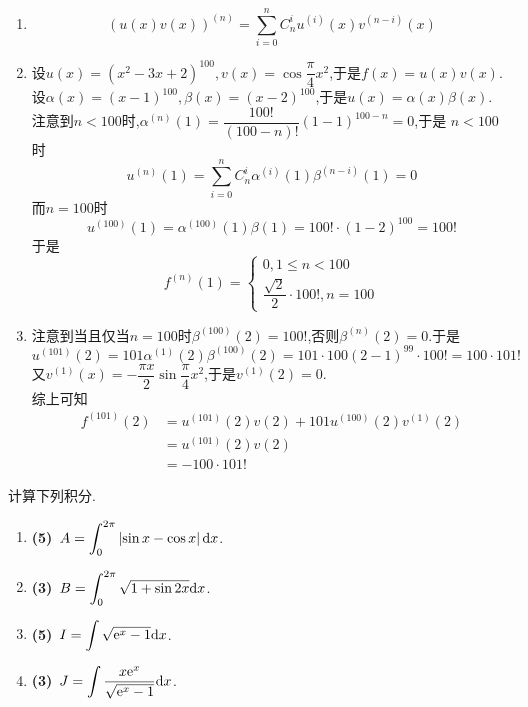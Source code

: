 \documentclass{ctexart}
\begin{document}
\begin{solution}
    \begin{enumerate}[label=\textbf{(\arabic*)}]
        \item $$\left(u(x)v(x)\right)^{(n)}=\sum_{i=0}^{n}C_n^iu^{(i)}(x)v^{(n-i)}(x)$$
        \item 设$u(x)=\left(x^2-3x+2\right)^{100},v(x)=\cos\dfrac{\pi}{4}x^2$,于是$f(x)=u(x)v(x)$.\\
            设$\alpha(x)=(x-1)^{100},\beta(x)=(x-2)^{100}$,于是$u(x)=\alpha(x)\beta(x)$.\\
            注意到$n<100$时,$\alpha^{(n)}(1)=\dfrac{100!}{(100-n)!}(1-1)^{100-n}=0$,于是
            $n<100$时$$u^{(n)}(1)=\sum_{i=0}^{n}C_n^i\alpha^{(i)}(1)\beta^{(n-i)}(1)=0$$
            而$n=100$时$$u^{(100)}(1)=\alpha^{(100)}(1)\beta(1)=100!\cdot(1-2)^{100}=100!$$
            于是$$f^{(n)}(1)=\left\{\begin{array}{l}
                0,1\leqslant n<100\\
                \dfrac{\sqrt{2}}{2}\cdot100!,n=100
            \end{array}\right.$$
        \item 注意到当且仅当$n=100$时$\beta^{(100)}(2)=100!$,否则$\beta^{(n)}(2)=0$.于是
            $$u^{(101)}(2)=101\alpha^{(1)}(2)\beta^{(100)}(2)=101\cdot100(2-1)^{99}\cdot100!=100\cdot101!$$
            又$v^{(1)}(x)=-\dfrac{\pi x}{2}\sin\dfrac{\pi}{4}x^2$,于是$v^{(1)}(2)=0$.\\
            综上可知$$\begin{aligned}
                f^{(101)}(2)
                &= u^{(101)}(2)v(2)+101u^{(100)}(2)v^{(1)}(2) \\
                &= u^{(101)}(2)v(2) \\
                &= -100\cdot101!
            \end{aligned}$$
    \end{enumerate}
\end{solution}
\begin{problem}[4.(16\songti{分})]
    计算下列积分.
    \begin{enumerate}[label=\textbf{(\arabic*)}]
        \item \textbf{(5)}\ $\displaystyle A=\int_{0}^{2\pi}\left|\sin x-\cos x\right|\mathrm{d} x$.
        \item \textbf{(3)}\ $\displaystyle B=\int_{0}^{2\pi}\sqrt{1+\sin2x}\mathrm{d} x$.
        \item \textbf{(5)}\ $\displaystyle I=\int\sqrt{\mathrm{e}^x-1}\mathrm{d} x$.
        \item \textbf{(3)}\ $\displaystyle J=\int\dfrac{x\mathrm{e}^x}{\sqrt{\mathrm{e}^x-1}}\mathrm{d} x$.
    \end{enumerate}
\end{problem}
\end{document}
